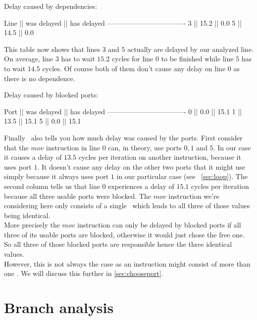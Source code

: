 \begin{Example}
Delay caused by dependencies:

Line || was delayed || has delayed
----------------------------------
 3   ||    15.2     ||     0.0
 5   ||    14.5     ||     0.0
\end{Example}

This table now shows that lines $3$ and $5$ actually are delayed by our analyzed line. On average, line $3$ has to wait $15.2$ cycles for line $0$ to be finished while line $5$ has to wait $14.5$ cycles. Of course both of them don't cause any delay on line $0$ as there is no dependence.\\

\begin{Example}
Delay caused by blocked ports:

Port || was delayed || has delayed
----------------------------------
 0   ||     0.0     ||    15.1
 1   ||    13.5     ||    15.1
 5   ||     0.0     ||    15.1
\end{Example}

Finally \suaca\ also tells you how much delay was caused by the ports. First consider that the $mov$ instruction in line $0$ can, in theory, use ports $0, 1$ and $5$. In our case it causes a delay of $13.5$ cycles per iteration on another instruction, because it uses port $1$. It doesn't cause any delay on the other two ports that it might use simply because it always uses port $1$ in our particular case (see ~\autoref{sec:loop}). The second column tells us that line $0$ experiences a delay of $15.1$ cycles per iteration because all three usable ports were blocked. The $mov$ instruction we're considering here only consists of a single \microop\ which leads to all three of those values being identical.\\
More precisely the $mov$ instruction can only be delayed by blocked ports if all three of its usable ports are blocked, otherwise it would just chose the free one. So all three of those blocked ports are responsible hence the three identical values.\\
However, this is not always the case as an instruction might consist of more than one \microop. We will discuss this further in \autoref{sec:chooseport}.




\section{Branch analysis}

